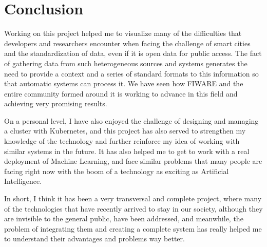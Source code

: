 \chapter{Conclusion}
\label{chapter:Conclusion}


Working on this project helped me to visualize many of the difficulties that developers and researchers encounter when facing the challenge of smart cities and the standardization of data, even if it is open data for public access. The fact of gathering data from such heterogeneous sources and systems generates the need to provide a context and a series of standard formats to this information so that automatic systems can process it. We have seen how FIWARE and the entire community formed around it is working to advance in this field and achieving very promising results.

On a personal level, I have also enjoyed the challenge of designing and managing a cluster with Kubernetes, and this project has also served to strengthen my knowledge of the technology and further reinforce my idea of working with similar systems in the future. It has also helped me to get to work with a real deployment of Machine Learning, and face similar problems that many people are facing right now with the boom of a technology as exciting as Artificial Intelligence.

In short, I think it has been a very transversal and complete project, where many of the technologies that have recently arrived to stay in our society, although they are invisible to the general public, have been addressed, and meanwhile, the problem of integrating them and creating a complete system has really helped me to understand their advantages and problems way better.
